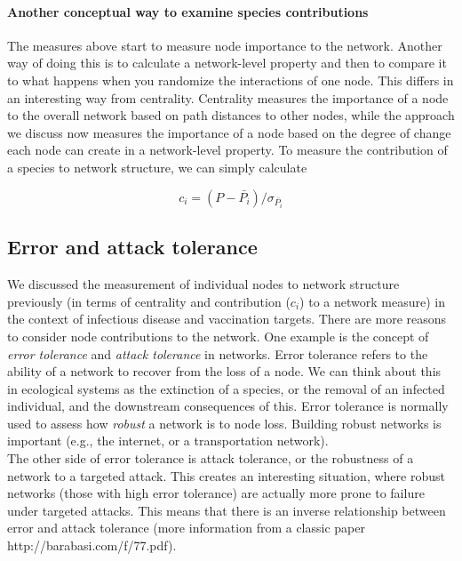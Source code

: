 \documentclass[12pt]{article}
\begin{document}
\paragraph*{Another conceptual way to examine species contributions}

The measures above start to measure node importance to the network. Another way of doing this is to calculate a network-level property and then to compare it to what happens when you randomize the interactions of one node. This differs in an interesting way from centrality. Centrality measures the importance of a node to the overall network based on path distances to other nodes, while the approach we discuss now measures the importance of a node based on the degree of change each node can create in a network-level property. To measure the contribution of a species to network structure, we can simply calculate 

\[ c_i = (P - \bar{P_i}) / \sigma_\bar{P_i} \]














\clearpage





\subsection*{Error and attack tolerance}

We discussed the measurement of individual nodes to network structure previously (in terms of centrality and contribution ($c_i$) to a network measure) in the context of infectious disease and vaccination targets. There are more reasons to consider node contributions to the network. One example is the concept of \textit{error tolerance} and \textit{attack tolerance} in networks. Error tolerance refers to the ability of a network to recover from the loss of a node. We can think about this in ecological systems as the extinction of a species, or the removal of an infected individual, and the downstream consequences of this. Error tolerance is normally used to assess how \textit{robust} a network is to node loss. Building robust networks is important (e.g., the internet, or a transportation network). \\

The other side of error tolerance is attack tolerance, or the robustness of a network to a targeted attack. This creates an interesting situation, where robust networks (those with high error tolerance) are actually more prone to failure under targeted attacks. This means that there is an inverse relationship between error and attack tolerance (more information from a classic paper http://barabasi.com/f/77.pdf). 
\end{document}
